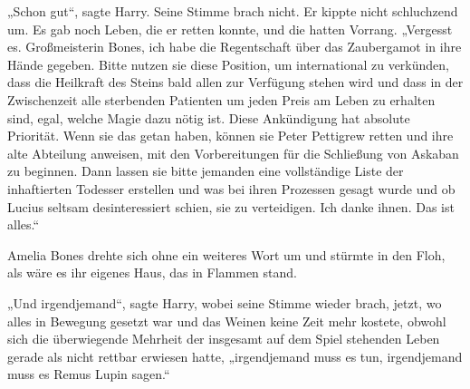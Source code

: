 „Schon gut“, sagte Harry. Seine Stimme brach nicht. Er kippte nicht schluchzend um.
Es gab noch Leben, die er retten konnte, und die hatten Vorrang.
„Vergesst es. Großmeisterin Bones, ich habe die Regentschaft über das Zaubergamot in ihre Hände gegeben. Bitte nutzen sie diese Position, um international zu verkünden, dass die Heilkraft des Steins bald allen zur Verfügung stehen wird und dass in der Zwischenzeit alle sterbenden Patienten um jeden Preis am Leben zu erhalten sind, egal, welche Magie dazu nötig ist. Diese Ankündigung hat absolute Priorität. Wenn sie das getan haben, können sie Peter Pettigrew retten und ihre alte Abteilung anweisen, mit den Vorbereitungen für die Schließung von Askaban zu beginnen. Dann lassen sie bitte jemanden eine vollständige Liste der inhaftierten Todesser erstellen und was bei ihren Prozessen gesagt wurde und ob Lucius seltsam desinteressiert schien, sie zu verteidigen. Ich danke ihnen. Das ist alles.“

Amelia Bones drehte sich ohne ein weiteres Wort um und stürmte in den Floh, als wäre es ihr eigenes Haus, das in Flammen stand.

„Und irgendjemand“, sagte Harry, wobei seine Stimme wieder brach, jetzt, wo alles in Bewegung gesetzt war und das Weinen keine Zeit mehr kostete, obwohl sich die überwiegende Mehrheit der insgesamt auf dem Spiel stehenden Leben gerade als nicht rettbar erwiesen hatte, „irgendjemand muss es tun, irgendjemand muss es Remus Lupin sagen.“

